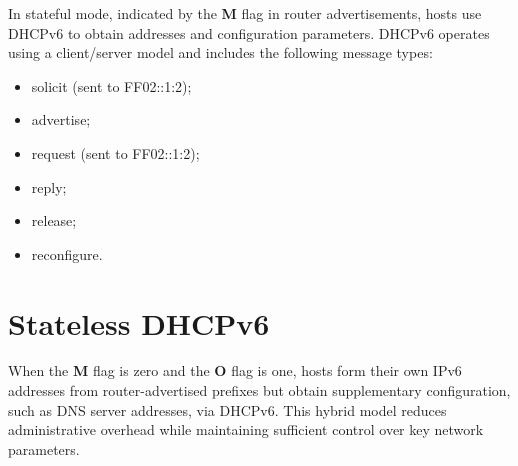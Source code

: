 In stateful mode, indicated by the \textbf{M} flag in router advertisements, hosts use DHCPv6 to obtain addresses and configuration parameters. DHCPv6 operates using a client/server model and includes the following message types:

\begin{itemize}
\item solicit (sent to FF02::1:2);
\item advertise;
\item request (sent to FF02::1:2);
\item reply;
\item release;
\item reconfigure.
\end{itemize}

\section{Stateless DHCPv6}

When the \textbf{M} flag is zero and the \textbf{O} flag is one, hosts form their own IPv6 addresses from router-advertised prefixes but obtain supplementary configuration, such as DNS server addresses, via DHCPv6. This hybrid model reduces administrative overhead while maintaining sufficient control over key network parameters.


